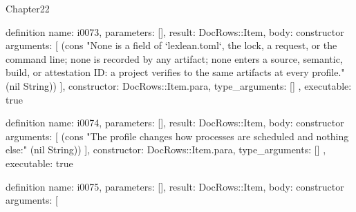 \begin{lexlean}{Chapter22}
\begin{semanticmodule}
definition{
  name: i0073,
  parameters: [],
  result: DocRows::Item,
  body: constructor{
    arguments: [
      (cons "None is a field of `lexlean.toml`, the lock, a request, or the command line; none is recorded by any artifact; none enters a source, semantic, build, or attestation ID: a project verifies to the same artifacts at every profile." (nil String))
    ],
    constructor: DocRows::Item.para,
    type_arguments: []
  },
  executable: true
}

definition{
  name: i0074,
  parameters: [],
  result: DocRows::Item,
  body: constructor{
    arguments: [
      (cons "The profile changes how processes are scheduled and nothing else:" (nil String))
    ],
    constructor: DocRows::Item.para,
    type_arguments: []
  },
  executable: true
}

definition{
  name: i0075,
  parameters: [],
  result: DocRows::Item,
  body: constructor{
    arguments: [
}}
\end{semanticmodule}
\end{lexlean}
